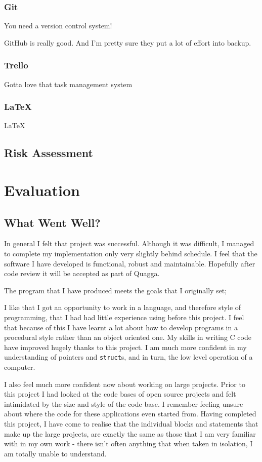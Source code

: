 \documentclass[12pt]{report}
\begin{document}
\subsection{Git}
You need a version control system!

GitHub is really good. And I'm pretty sure they put a lot of effort into backup.

\subsection{Trello}
Gotta love that task management system

\subsection{\LaTeX}
\LaTeX 

\section{Risk Assessment}

\chapter{Evaluation}

\section{What Went Well?}
In general I felt that project was successful. Although it was difficult, I
managed to complete my implementation only very slightly behind schedule. I
feel that the software I have developed is functional, robust and maintainable.
Hopefully after code review it will be accepted as part of Quagga.

The program that I have produced meets the goals that I originally set; 

I like that I got an opportunity to work in a language, and therefore style of
programming, that I had had little experience using before this project.  I
feel that because of this I have learnt a lot about how to develop programs in
a procedural style rather than an object oriented one. My skills in writing C
code have improved hugely thanks to this project. I am much more confident in
my understanding of pointers and \texttt{struct}s, and in turn, the low level
operation of a computer.  

I also feel much more confident now about working on large projects. Prior to
this project I had looked at the code bases of open source projects and felt
intimidated by the size and style of the code base. I remember feeling unsure
about where the code for these applications even started from. Having completed
this project, I have come to realise that the individual blocks and statements
that make up the large projects, are exactly the same as those that I am very
familiar with in my own work - there isn't often anything that when taken in
isolation, I am totally unable to understand.
\end{document}
